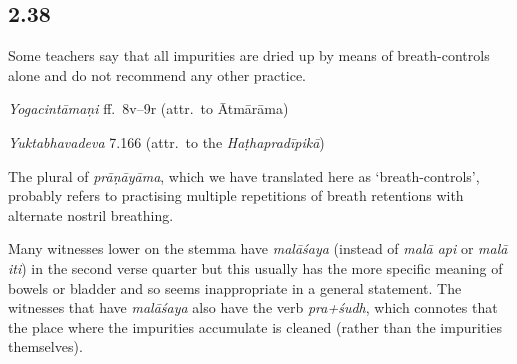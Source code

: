 \begin{ekdosis}
\subsection*{2.38}
\begin{translation}[hp02_038]
Some teachers say that all impurities are dried up by means of breath-controls alone and do not recommend any other practice.
\end{translation}


\begin{testimonia}[hp02_038]
\emph{Yogacintāmaṇi} ff.~8v–9r (attr.~to Ātmārāma)

\begin{versinnote}
\end{versinnote}

\emph{Yuktabhavadeva} 7.166 (attr.~to the \emph{Haṭhapradīpikā})

\begin{versinnote}
\end{versinnote}
\end{testimonia}

\begin{philcomm}[hp02_038]
The plural of \emph{prāṇāyāma}, which we have translated here as ‘breath-controls’, probably refers to practising multiple repetitions of breath retentions with alternate nostril breathing. 

Many witnesses lower on the stemma have \emph{malāśaya} (instead of \emph{malā api} or \emph{malā iti}) in the second verse quarter but this usually has the more specific meaning of bowels or bladder and so seems inappropriate in a general statement. The witnesses that have \emph{malāśaya} also have the verb \emph{pra+śudh}, which connotes that the place where the impurities accumulate is cleaned (rather than the impurities themselves). 
\end{philcomm}


\end{ekdosis}
